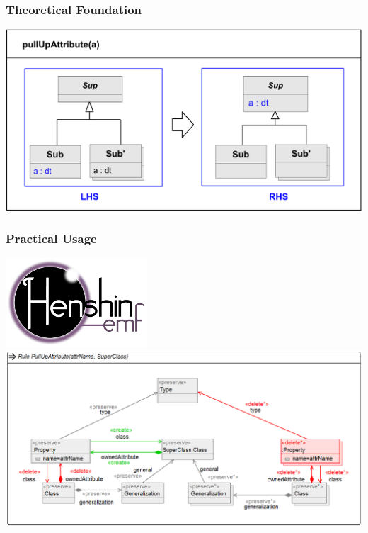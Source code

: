 \begin{frame}
  \frametitle{Theoretical Foundation}
  \begin{center}
  \includegraphics[scale=0.4]{images/graph_theory}
  \end{center}
\end{frame}

\begin{frame}
  \frametitle{Practical Usage}
  \begin{center}
  \includegraphics[scale=2.0]{images/henshinLogo}\\
  \includegraphics[scale=0.3]{images/pullUp_HR}
  \end{center}
\end{frame}